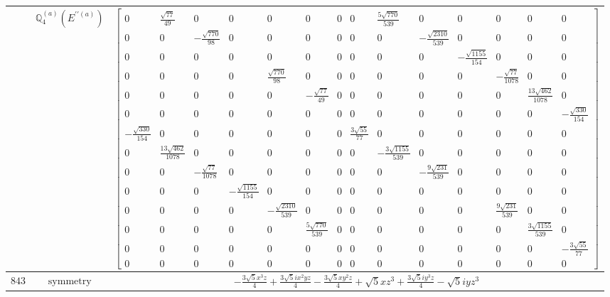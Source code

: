 \documentclass[fleqn,8pt,landscape]{jsarticle}
\begin{document}
\begin{longtable}{ccc}
$  $ & $ \mathbb{Q}_{4}^{(a)}(E^{\prime\prime(a)}) $ & $ \begin{bmatrix} 0 & \frac{\sqrt{77}}{49} & 0 & 0 & 0 & 0 & 0 & 0 & \frac{5 \sqrt{770}}{539} & 0 & 0 & 0 & 0 & 0 \\ 0 & 0 & - \frac{\sqrt{770}}{98} & 0 & 0 & 0 & 0 & 0 & 0 & - \frac{\sqrt{2310}}{539} & 0 & 0 & 0 & 0 \\ 0 & 0 & 0 & 0 & 0 & 0 & 0 & 0 & 0 & 0 & - \frac{\sqrt{1155}}{154} & 0 & 0 & 0 \\ 0 & 0 & 0 & 0 & \frac{\sqrt{770}}{98} & 0 & 0 & 0 & 0 & 0 & 0 & - \frac{\sqrt{77}}{1078} & 0 & 0 \\ 0 & 0 & 0 & 0 & 0 & - \frac{\sqrt{77}}{49} & 0 & 0 & 0 & 0 & 0 & 0 & \frac{13 \sqrt{462}}{1078} & 0 \\ 0 & 0 & 0 & 0 & 0 & 0 & 0 & 0 & 0 & 0 & 0 & 0 & 0 & - \frac{\sqrt{330}}{154} \\ - \frac{\sqrt{330}}{154} & 0 & 0 & 0 & 0 & 0 & 0 & \frac{3 \sqrt{55}}{77} & 0 & 0 & 0 & 0 & 0 & 0 \\ 0 & \frac{13 \sqrt{462}}{1078} & 0 & 0 & 0 & 0 & 0 & 0 & - \frac{3 \sqrt{1155}}{539} & 0 & 0 & 0 & 0 & 0 \\ 0 & 0 & - \frac{\sqrt{77}}{1078} & 0 & 0 & 0 & 0 & 0 & 0 & - \frac{9 \sqrt{231}}{539} & 0 & 0 & 0 & 0 \\ 0 & 0 & 0 & - \frac{\sqrt{1155}}{154} & 0 & 0 & 0 & 0 & 0 & 0 & 0 & 0 & 0 & 0 \\ 0 & 0 & 0 & 0 & - \frac{\sqrt{2310}}{539} & 0 & 0 & 0 & 0 & 0 & 0 & \frac{9 \sqrt{231}}{539} & 0 & 0 \\ 0 & 0 & 0 & 0 & 0 & \frac{5 \sqrt{770}}{539} & 0 & 0 & 0 & 0 & 0 & 0 & \frac{3 \sqrt{1155}}{539} & 0 \\ 0 & 0 & 0 & 0 & 0 & 0 & 0 & 0 & 0 & 0 & 0 & 0 & 0 & - \frac{3 \sqrt{55}}{77} \\ 0 & 0 & 0 & 0 & 0 & 0 & 0 & 0 & 0 & 0 & 0 & 0 & 0 & 0 \end{bmatrix} $ \\ \hline
$ 843 $ & $ \text{symmetry} $ & $ - \frac{3 \sqrt{5} x^{3} z}{4} + \frac{3 \sqrt{5} i x^{2} y z}{4} - \frac{3 \sqrt{5} x y^{2} z}{4} + \sqrt{5} x z^{3} + \frac{3 \sqrt{5} i y^{3} z}{4} - \sqrt{5} i y z^{3} $ \\

\end{longtable}
\end{document}
